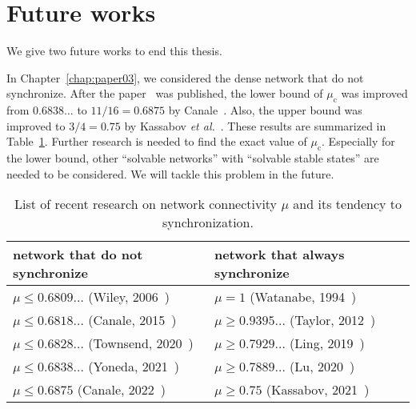 \section{Future works}
We give two future works to end this thesis.

In Chapter~\ref{chap:paper03}, we considered the dense network that do not synchronize.
After the paper~\cite{yoneda2021} was published, the lower bound of $\mu_{\mathrm{c}}$ was improved from $0.6838\dots$ to $11/16=0.6875$ by Canale~\cite{canale2022}.
Also, the upper bound was improved to $3/4=0.75$ by Kassabov \textit{et al.}~\cite{kassabov2021}.
These results are summarized in Table~\ref{table:list-mu}.
Further research is needed to find the exact value of $\mu_{\mathrm{c}}$.
Especially for the lower bound, other ``solvable networks'' with ``solvable stable states'' are needed to be considered.
We will tackle this problem in the future.
\begin{table}[htb]
  \caption{List of recent research on network connectivity $\mu$ and its tendency to synchronization.}
  \label{table:list-mu}
  \centering
  \begin{tabular}{ll}
    network that do not synchronize & network that always synchronize \\\hline
    $\mu\leq0.6809\dots$ (Wiley, 2006~\cite{wiley2006}) & $\mu=1$ (Watanabe, 1994~\cite{watanabe1994}) \\
    $\mu\leq0.6818\dots$ (Canale, 2015~\cite{canale2015}) & $\mu\geq0.9395\dots$ (Taylor, 2012~\cite{taylor2012})\\
    $\mu\leq0.6828\dots$ (Townsend, 2020~\cite{townsend2020}) & $\mu\geq0.7929\dots$ (Ling, 2019~\cite{ling2019}) \\
    $\mu\leq0.6838\dots$ (Yoneda, 2021~\cite{yoneda2021}) & $\mu\geq0.7889\dots$ (Lu, 2020~\cite{lu2020}) \\
    $\mu\leq0.6875$ (Canale, 2022~\cite{canale2022}) & $\mu\geq0.75$ (Kassabov, 2021~\cite{kassabov2021})
  \end{tabular}
\end{table}

